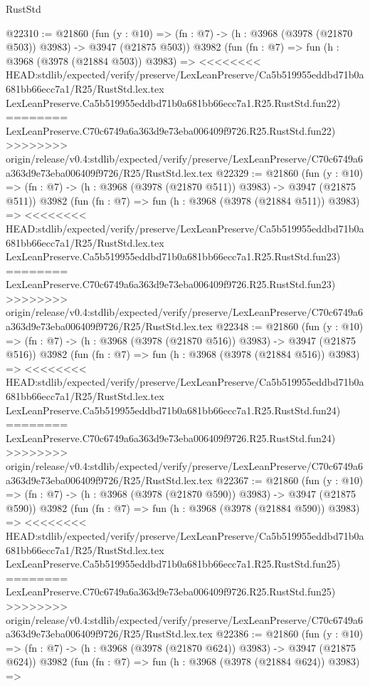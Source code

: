 \begin{lexlean}{RustStd}
\begin{coremodule}
{\begin{coremodule}
{{{{{{{{{{{{{{{{{{{{{{{{{{{{{{{{{{{{{{@22310 := @21860
    (fun (y : @10) => (fn : @7) -> (h : @3968 (@3978 (@21870 @503)) @3983) -> @3947 (@21875 @503))
    @3982
    (fun (fn : @7) =>
    fun (h : @3968 (@3978 (@21884 @503)) @3983) =>
<<<<<<<< HEAD:stdlib/expected/verify/preserve/LexLeanPreserve/Ca5b519955eddbd71b0a681bb66ecc7a1/R25/RustStd.lex.tex
    LexLeanPreserve.Ca5b519955eddbd71b0a681bb66ecc7a1.R25.RustStd.fun22)
========
    LexLeanPreserve.C70c6749a6a363d9e73eba006409f9726.R25.RustStd.fun22)
>>>>>>>> origin/release/v0.4:stdlib/expected/verify/preserve/LexLeanPreserve/C70c6749a6a363d9e73eba006409f9726/R25/RustStd.lex.tex
@22329 := @21860
    (fun (y : @10) => (fn : @7) -> (h : @3968 (@3978 (@21870 @511)) @3983) -> @3947 (@21875 @511))
    @3982
    (fun (fn : @7) =>
    fun (h : @3968 (@3978 (@21884 @511)) @3983) =>
<<<<<<<< HEAD:stdlib/expected/verify/preserve/LexLeanPreserve/Ca5b519955eddbd71b0a681bb66ecc7a1/R25/RustStd.lex.tex
    LexLeanPreserve.Ca5b519955eddbd71b0a681bb66ecc7a1.R25.RustStd.fun23)
========
    LexLeanPreserve.C70c6749a6a363d9e73eba006409f9726.R25.RustStd.fun23)
>>>>>>>> origin/release/v0.4:stdlib/expected/verify/preserve/LexLeanPreserve/C70c6749a6a363d9e73eba006409f9726/R25/RustStd.lex.tex
@22348 := @21860
    (fun (y : @10) => (fn : @7) -> (h : @3968 (@3978 (@21870 @516)) @3983) -> @3947 (@21875 @516))
    @3982
    (fun (fn : @7) =>
    fun (h : @3968 (@3978 (@21884 @516)) @3983) =>
<<<<<<<< HEAD:stdlib/expected/verify/preserve/LexLeanPreserve/Ca5b519955eddbd71b0a681bb66ecc7a1/R25/RustStd.lex.tex
    LexLeanPreserve.Ca5b519955eddbd71b0a681bb66ecc7a1.R25.RustStd.fun24)
========
    LexLeanPreserve.C70c6749a6a363d9e73eba006409f9726.R25.RustStd.fun24)
>>>>>>>> origin/release/v0.4:stdlib/expected/verify/preserve/LexLeanPreserve/C70c6749a6a363d9e73eba006409f9726/R25/RustStd.lex.tex
@22367 := @21860
    (fun (y : @10) => (fn : @7) -> (h : @3968 (@3978 (@21870 @590)) @3983) -> @3947 (@21875 @590))
    @3982
    (fun (fn : @7) =>
    fun (h : @3968 (@3978 (@21884 @590)) @3983) =>
<<<<<<<< HEAD:stdlib/expected/verify/preserve/LexLeanPreserve/Ca5b519955eddbd71b0a681bb66ecc7a1/R25/RustStd.lex.tex
    LexLeanPreserve.Ca5b519955eddbd71b0a681bb66ecc7a1.R25.RustStd.fun25)
========
    LexLeanPreserve.C70c6749a6a363d9e73eba006409f9726.R25.RustStd.fun25)
>>>>>>>> origin/release/v0.4:stdlib/expected/verify/preserve/LexLeanPreserve/C70c6749a6a363d9e73eba006409f9726/R25/RustStd.lex.tex
@22386 := @21860
    (fun (y : @10) => (fn : @7) -> (h : @3968 (@3978 (@21870 @624)) @3983) -> @3947 (@21875 @624))
    @3982
    (fun (fn : @7) =>
    fun (h : @3968 (@3978 (@21884 @624)) @3983) =>
}}}}}}}}}}}}}}}}}}}}}}}}}}}}}}}}}}}}}}
\end{coremodule}}
\end{coremodule}
\end{lexlean}
